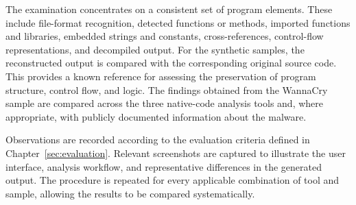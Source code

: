 The examination concentrates on a consistent set of program elements. These include file-format recognition, detected functions or methods, imported functions and libraries, 
embedded strings and constants, cross-references, control-flow representations, and decompiled output. For the synthetic samples, the reconstructed output is compared with the 
corresponding original source code. This provides a known reference for assessing the preservation of program structure, control flow, and logic. The findings obtained from 
the WannaCry sample are compared across the three native-code analysis tools and, where appropriate, with publicly documented information about the malware.

Observations are recorded according to the evaluation criteria defined in Chapter~\ref{sec:evaluation}. Relevant screenshots are captured to illustrate the user interface, analysis workflow, 
and representative differences in the generated output. The procedure is repeated for every applicable combination of tool and sample, allowing the results to be compared systematically.

